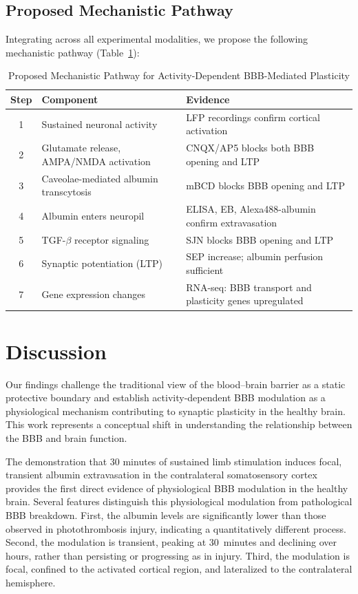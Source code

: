 \documentclass[11pt]{article}
\begin{document}
\subsection{Proposed Mechanistic Pathway}

Integrating across all experimental modalities, we propose the following mechanistic pathway (Table~\ref{tab:pathway}):

\begin{table}[ht]
\centering
\caption{Proposed Mechanistic Pathway for Activity-Dependent BBB-Mediated Plasticity}
\label{tab:pathway}
\begin{tabular}{clp{7cm}}
\toprule
\textbf{Step} & \textbf{Component} & \textbf{Evidence} \\
\midrule
1 & Sustained neuronal activity & LFP recordings confirm cortical activation \\
2 & Glutamate release, AMPA/NMDA activation & CNQX/AP5 blocks both BBB opening and LTP \\
3 & Caveolae-mediated albumin transcytosis & mBCD blocks BBB opening and LTP \\
4 & Albumin enters neuropil & ELISA, EB, Alexa488-albumin confirm extravasation \\
5 & TGF-$\beta$ receptor signaling & SJN blocks BBB opening and LTP \\
6 & Synaptic potentiation (LTP) & SEP increase; albumin perfusion sufficient \\
7 & Gene expression changes & RNA-seq: BBB transport and plasticity genes upregulated \\
\bottomrule
\end{tabular}
\end{table}

\section{Discussion}

Our findings challenge the traditional view of the blood--brain barrier as a static protective boundary and establish activity-dependent BBB modulation as a physiological mechanism contributing to synaptic plasticity in the healthy brain. This work represents a conceptual shift in understanding the relationship between the BBB and brain function.

The demonstration that 30 minutes of sustained limb stimulation induces focal, transient albumin extravasation in the contralateral somatosensory cortex provides the first direct evidence of physiological BBB modulation in the healthy brain. Several features distinguish this physiological modulation from pathological BBB breakdown. First, the albumin levels are significantly lower than those observed in photothrombosis injury, indicating a quantitatively different process. Second, the modulation is transient, peaking at 30~minutes and declining over hours, rather than persisting or progressing as in injury. Third, the modulation is focal, confined to the activated cortical region, and lateralized to the contralateral hemisphere.
\end{document}
